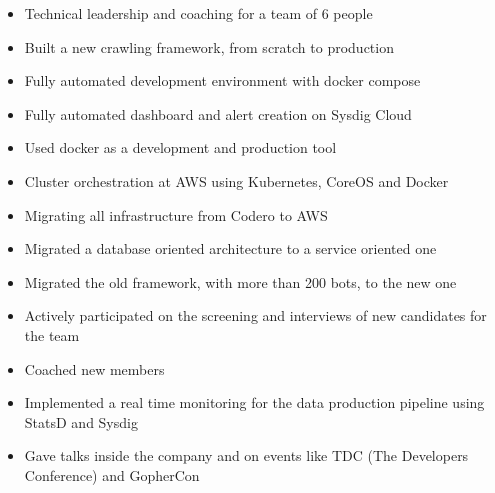 \documentclass[]{friggeri-cv} %
\begin{document}
\begin{entrylist}
{\begin{itemize}
    \item Technical leadership and coaching for a team of 6 people
    \item Built a new crawling framework, from scratch to production
    \item Fully automated development environment with docker compose
    \item Fully automated dashboard and alert creation on Sysdig Cloud
    \item Used docker as a development and production tool
    \item Cluster orchestration at AWS using Kubernetes, CoreOS and Docker
    \item Migrating all infrastructure from Codero to AWS
    \item Migrated a database oriented architecture to a service oriented one
    \item Migrated the old framework, with more than 200 bots, to the new one
    \item Actively participated on the screening and interviews of new candidates for the team
    \item Coached new members
    \item Implemented a real time monitoring for the data production pipeline using StatsD and Sysdig
    \item Gave talks inside the company and on events like TDC (The Developers Conference) and GopherCon
\end{itemize}
}
\end{entrylist}
\end{document}
